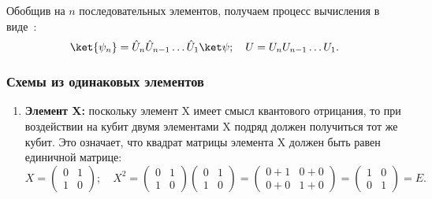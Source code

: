 \documentclass[pscyr,notitlepage]{hedwork}
\renewcommand{\~}[1]{\widetilde{#1}}
\begin{document}
  Обобщив на \( n \) последовательных элементов, получаем процесс вычисления в
  виде~\cite{main}:
  \[
    \ket{\psi_n} = \hat{U}_n\hat{U}_{n-1} \ldots \hat{U}_1\ket\psi; \quad
      U = U_n U_{n-1} \ldots U_1.
  \]
  
  \subsubsection{Схемы из одинаковых элементов}
  
  \begin{enumerate}
    \item \textbf{Элемент X:}
      поскольку элемент X имеет смысл квантового отрицания, то при воздействии
      на кубит двумя элементами X подряд должен получиться тот же кубит. Это
      означает, что квадрат матрицы элемента X должен быть равен единичной
      матрице:
      \[
        X =
        \begin{pmatrix}
          0 & 1 \\[-1.7ex] 1 & 0
        \end{pmatrix}\!\!;
        \quad
        X^2 =
        \begin{pmatrix}
          0 & 1 \\[-1.7ex] 1 & 0
        \end{pmatrix}
        \begin{pmatrix}
          0 & 1 \\[-1.7ex] 1 & 0
        \end{pmatrix} =
        \begin{pmatrix}
          0 + 1 & 0 + 0 \\[-1.7ex] 0 + 0 & 1 + 0
        \end{pmatrix} =
        \begin{pmatrix}
          1 & 0 \\[-1.7ex] 0 & 1
        \end{pmatrix} = E.
      \]
      

\end{enumerate}
\end{document}

